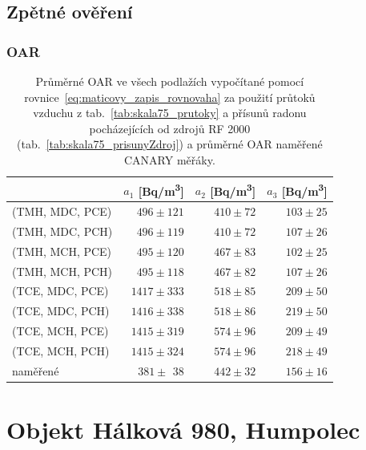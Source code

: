 
\subsection{Zpětné ověření}

\subsubsection{OAR}
\begin{table}[H]
    \centering
    \caption{Průměrné OAR ve všech podlažích vypočítané pomocí rovnice~\eqref{eq:maticovy_zapis_rovnovaha} za použití průtoků vzduchu z tab.~\ref{tab:skala75_prutoky} a přísunů radonu pocházejících od zdrojů RF 2000 (tab.~\ref{tab:skala75_prisunyZdroj}) a průměrné OAR naměřené CANARY měřáky.}
    \label{tab:skala75_OAR_zpetne}
    \begin{tabular}{lrrr}
        \toprule
        & $a_1$ [\si{Bq/m^3}] &  $a_2$ [\si{Bq/m^3}]& $a_3$ [\si{Bq/m^3}] \\
        \midrule
(TMH, MDC, PCE) & $ 496\pm121$ & $410\pm72$ & $103\pm25$ \\
(TMH, MDC, PCH) & $ 496\pm119$ & $410\pm72$ & $107\pm26$ \\
(TMH, MCH, PCE) & $ 495\pm120$ & $467\pm83$ & $102\pm25$ \\
(TMH, MCH, PCH) & $ 495\pm118$ & $467\pm82$ & $107\pm26$ \\
(TCE, MDC, PCE) & $1417\pm333$ & $518\pm85$ & $209\pm50$ \\
(TCE, MDC, PCH) & $1416\pm338$ & $518\pm86$ & $219\pm50$ \\
(TCE, MCH, PCE) & $1415\pm319$ & $574\pm96$ & $209\pm49$ \\
(TCE, MCH, PCH) & $1415\pm324$ & $574\pm96$ & $218\pm49$ \\
\midrule
       naměřené & $381\pm\ \,38$ & $442\pm32$ & $156\pm16$ \\
        \bottomrule
    \end{tabular}
\end{table}

\section{Objekt Hálková 980, Humpolec}
